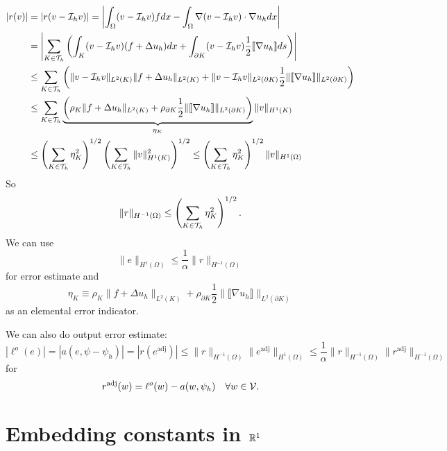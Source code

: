 \begin{align*}
  |r(v)|
  &= | r (v - \mathcal{I}_h v) |
  = \left| \int_\Omega (v - \mathcal{I}_h v) f dx - \int_\Omega \nabla (v - \mathcal{I}_h v) \cdot \nabla u_h dx \right|
  \\
  &= \left| \sum_{K \in \mathcal{T}_h} \left( \int_K (v - \mathcal{I}_h v) (f + \Delta u_h) dx
  + \int_{\partial K} (v - \mathcal{I}_h v) \frac{1}{2} \llbracket \nabla u_h \rrbracket ds \right)  \right|
  \\
  &\leq \sum_{K \in \mathcal{T}_h} \left( \| v - \mathcal{I}_h v \|_{L^2(K)} \| f + \Delta u_h \|_{L^2(K)} + \| v - \mathcal{I}_h v \|_{L^2(\partial K)} \frac{1}{2} \| \llbracket \nabla u_h \rrbracket \|_{L^2(\partial K)}\right) 
  \\
  &\leq  \sum_{K \in \mathcal{T}_h} \underbrace{ \left( \rho_K \| f + \Delta u_h \|_{L^2(K)} + \rho_{\partial K}  \frac{1}{2} \| \llbracket \nabla u_h \rrbracket \|_{L^2(\partial K)} \right) }_{\eta_K}  \| v \|_{H^1(K)} 
  \\
  &\leq 
  \left(\sum_{K \in \mathcal{T}_h} \eta_K^2 \right)^{1/2} \left( \sum_{K \in \mathcal{T}_h} \| v \|_{H^1(K)}^2 \right)^{1/2}
  \leq   \left(\sum_{K \in \mathcal{T}_h} \eta_K^2 \right)^{1/2} \| v \|_{H^1(\Omega)}
\end{align*}
So
\begin{equation*}
  \| r \|_{H^{-1}(\Omega)} \leq  \left(\sum_{K \in \mathcal{T}_h} \eta_K^2 \right)^{1/2}.
\end{equation*}
We can use
\begin{equation*}
  \| e \|_{H^1(\Omega)} \leq \frac{1}{\alpha} \| r \|_{H^{-1}(\Omega)}
\end{equation*}
for error estimate and
\begin{equation*}
  \eta_K \equiv \rho_K \| f + \Delta u_h \|_{L^2(K)} + \rho_{\partial K}  \frac{1}{2} \| \llbracket \nabla u_h \rrbracket \|_{L^2(\partial K)}
\end{equation*}
as an elemental error indicator.

We can also do output error estimate:
\begin{equation*}
  | \ell^o(e) | = | a (e, \psi - \psi_h) | = | r(e^\text{adj}) |
  \leq \| r \|_{H^{-1}(\Omega)} \| e^\text{adj} \|_{H^1(\Omega)}
  \leq \frac{1}{\alpha} \| r \|_{H^{-1}(\Omega)} \| r^\text{adj} \|_{H^{-1}(\Omega)}
\end{equation*}
for
\begin{equation*}
  r^\text{adj}(w) = \ell^o(w) - a(w,\psi_h) \quad \forall w \in \mathcal{V}.
\end{equation*}

\section{Embedding constants in $\mathbb{R}^1$}


